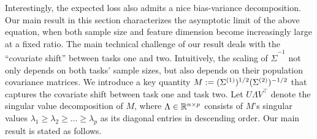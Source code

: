 Interestingly, the expected loss also admits a nice bias-variance decomposition.
Our main result in this section characterizes the asymptotic limit of the above equation, when both sample size and feature dimension become increasingly large at a fixed ratio.
The main technical challenge of our result deals with the ``covariate shift'' between tasks one and two.
Intuitively, the scaling of $\hat{\Sigma}^{-1}$ not only depends on both tasks' sample sizes, but also depends on their population covariance matrices.
We introduce a key quantity $M := (\Sigma^{(1)})^{1/2}(\Sigma^{(2)})^{-1/2}$ that captures the covariate shift between task one and task two.
Let $U\Lambda V^\top$ denote the singular value decomposition of $M$, where $\Lambda\in\mathbb{R}^{n\times p}$ consists of $M$'s singular values $\lambda_1\ge \lambda_2\ge \dots \ge \lambda_p$ as its diagonal entries in descending order.
Our main result is stated as follows.

